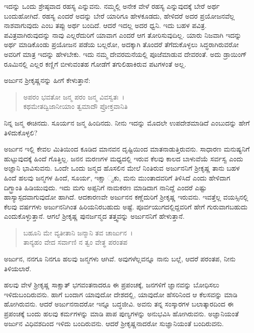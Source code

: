 ಇದನ್ನು ಒಂದು ಶ್ರೇಷ್ಠವಾದ ರಹಸ್ಯ ಎನ್ನುವನು. ನಮ್ಮಲ್ಲಿ ಅನೇಕ ವೇಳೆ ರಹಸ್ಯ ಎನ್ನುವುದಕ್ಕೆ ಬೇರೆ ಅರ್ಥ ಬಂದುಹೋಗಿದೆ. ರಹಸ್ಯ ಎಂದರೆ ಅದನ್ನು ಬೇರೆ ಯಾರಿಗೂ ಹೇಳಕೂಡದು, ಹೇಳಿದರೆ ಅದರ ಪ್ರಯೋಜನವೆಲ್ಲ ನಾಶವಾಗುವುದು ಎಂಬ ತಪ್ಪು ಅರ್ಥ ಬಂದಿದೆ. ಆದರೆ ಇದಲ್ಲ ಅದರ ಧ್ವನಿ. ಇದು ಬಹಳ ಪವಿತ್ರ. ಪವಿತ್ರವಾಗಿರುವುದನ್ನು ನಾವು ಎಲ್ಲರೆದುರಿಗೆ ಯಾವಾಗ ಎಂದರೆ ಆಗ ತೋರಿಸುವುದಿಲ್ಲ. ಯಾರು ನಿಜವಾಗಿ ಇದನ್ನು ಅರ್ಥ ಮಾಡಿಕೊಂಡು ಪ್ರಯೋಜನ ಪಡೆಯ ಬಲ್ಲರೋ, ಅದಕ್ಕಾಗಿ ತೊಂದರೆ ತೆಗೆದುಕೊಳ್ಳಲು ಸಿದ್ಧರಾಗಿರುವರೋ ಅವರಿಗೆ ಮಾತ್ರ ಇದನ್ನು ಹೇಳಬೇಕು. ಇದು ನಮ್ಮ ದೇವರಮನೆಯಲ್ಲಿ ಪೂಜೆಮಾಡುವ ದೇವರಂತೆ. ಅದು ಡ್ರಾಯಿಂಗ್ ರೂಮಿನಲ್ಲಿ ಎಲ್ಲರ ಕಣ್ಣಿಗೆ ಬೀಳುವಂತಹ ಗೋಡೆಗೆ ತಗುಲಿಹಾಕಿರುವ ಪಟಗಳಂತೆ ಅಲ್ಲ.

ಅರ್ಜುನ ಶ‍್ರೀಕೃಷ್ಣನನ್ನು ಹೀಗೆ ಕೇಳುತ್ತಾನೆ:

\begin{verse}
ಅಪರಂ ಭವತೋ ಜನ್ಮ ಪರಂ ಜನ್ಮ ವಿವಸ್ವತಃ~।\\ಕಥಮೇತದ್ವಿಜಾನೀಯಾಂ ತ್ವಮಾದೌ ಪ್ರೋಕ್ತವಾನಿತಿ 
\end{verse}

{\small ನಿನ್ನ ಜನ್ಮ ಈಚಿನದು. ಸೂರ್ಯನ ಜನ್ಮ ಹಿಂದಿನದು. ನೀನು ಇದನ್ನು ಮೊದಲೇ ಉಪದೇಶಮಾಡಿದೆ ಎಂಬುದನ್ನು ಹೇಗೆ ತಿಳಿದುಕೊಳ್ಳಲಿ?}

ಅರ್ಜುನ ಇಲ್ಲಿ ಕೇವಲ ಮಿತಿಯಿಂದ ಕೂಡಿದ ಮಾನವನ ದೃಷ್ಟಿಯಿಂದ ಮಾತನಾಡುತ್ತಿರುವನು. ಸಾಧಾರಣ ಮನುಷ್ಯನಿಗೆ ಹುಟ್ಟುವುದಕ್ಕೆ ಹಿಂದೆ ಗೊತ್ತಿಲ್ಲ. ಜನನ ಮರಣಗಳ ಮಧ್ಯದಲ್ಲಿ ಇರುವ ಕೆಲವು ಕಾಲದ ಬಾಳುವೆಯೆ ಸರ್ವಸ್ವ ಎಂದು ಅಜ್ಞಾನಿ ಭಾವಿಸುವನು. ಒಂದೇ ಒಂದು ಜನ್ಮದ ಹೊಸಲಿನ ಮೇಲೆ ನಿಂತಿರುವ ಅರ್ಜುನನಿಗೆ ಶ‍್ರೀಕೃಷ್ಣ ತಾನು ಬಹಳ ಹಿಂದೆ ಹಲವು ಜನ್ಮಗಳ ಹಿಂದೆ, ಸೂರ್ಯ, ಇಕ್ಷಾ ್ವಕು, ಮನು ಮುಂತಾದವರಿಗೆ ತಿಳಿಸಿದೆ ಎಂದು ಹೇಳಿದಾಗ ದಿಗ್ಭ್ರಾಂತಿ ಹಿಡಿಯುವುದು. ಇದು ಮಗು ಅಪ್ಪನಿಗೆ ನಾಮಕರಣ ಮಾಡಿದಾಗ ನಾನಿದ್ದೆ ಎಂದರೆ ಎಷ್ಟು ಹಾಸ್ಯಾಸ್ಪದವಾಗುವುದೋ ಹಾಗಿದೆ. ಆದಕಾರಣವೇ ಅರ್ಜುನನ ಕಣ್ಣೆದುರಿಗೆ ಶ‍್ರೀಕೃಷ್ಣ ಇರುವನು. ಇವತ್ತೆಲ್ಲ ವಯಸ್ಸಿನಲ್ಲಿ ಕೆಲವು ವರ್ಷಗಳು ಅರ್ಜುನನಿಗಿಂತ ಹಿರಿಯನಿರಬಹುದು ಅಷ್ಟೆ. ಪೂರ್ವಯುಗದಲ್ಲಿದ್ದವರಿಗೆ ಹೇಗೆ ಗುರುವಾಗಬಹುದು ಎಂದುಕೊಳ್ಳುತ್ತಾನೆ. ಆಗಲೆ ಶ‍್ರೀಕೃಷ್ಣ ಪುನರ್ಜನ್ಮದ ತತ್ತ್ವವನ್ನು ಅರ್ಜುನನಿಗೆ ಹೇಳುತ್ತಾನೆ.

\begin{verse}
ಬಹೂನಿ ಮೇ ವ್ಯತೀತಾನಿ ಜನ್ಮಾನಿ ತವ ಚಾರ್ಜುನ~।\\ತಾನ್ಯಹಂ ವೇದ ಸರ್ವಾಣಿ ನ ತ್ವಂ ವೇತ್ಥ ಪರಂತಪ 
\end{verse}

{\small ಅರ್ಜುನ, ನನಗೂ ನಿನಗೂ ಹಲವು ಜನ್ಮಗಳು ಆಗಿವೆ. ಅವುಗಳೆಲ್ಲವನ್ನೂ ನಾನು ಬಲ್ಲೆ, ಆದರೆ ಪರಂತಪ, ನೀನು ತಿಳಿಯಲಾರೆ.}

ಹಲವು ವೇಳೆ ಶ‍್ರೀಕೃಷ್ಣ ಸಾಕ್ಷಾತ್ ಭಗವಂತನಾದರೂ ಈ ಪ್ರಪಂಚಕ್ಕೆ, ಜನಗಳಿಗೆ ಜ್ಞಾನವನ್ನು ಬೋಧಿಸಲು ಇಳಿದುಬಂದಿರುವನು. ಹಾಗೆ ಬಂದಾಗ ಯಾವುದೋ ದೇಶದಲ್ಲಿ, ಯಾವುದೋ ಹೆಸರಿನಿಂದ ಆ ಕೆಲಸವನ್ನು ಮಾಡಿ ಹೋಗಿರುವನು. ಆದರೆ ಅರ್ಜುನನಾದರೋ ಇನ್ನೂ ಬದ್ಧಜೀವಿ. ಅವನು ತನ್ನ ಸಂಸ್ಕಾರಗಳ ಬಲಾತ್ಕಾರದಿಂದ ಈ ಪ್ರಪಂಚಕ್ಕೆ ಬಂದು ಹಲವು ಕರ್ಮಗಳನ್ನು ಮಾಡಿ ಪಾಪ ಪುಣ್ಯಗಳನ್ನು ಅನುಭವಿಸಿ ಹೋಗಿರುವನು. ಅಜ್ಞಾನಿಯಂತೆ ಅರ್ಜುನ ವಿಧಿವಶದಿಂದ ಇಳಿದು ಬಂದಿರುವನು. ಆದರೆ ಶ‍್ರೀಕೃಷ್ಣನಾದರೋ ಸುಜ್ಞಾನಿಯಂತೆ ಬಂದಿರುವನು.

